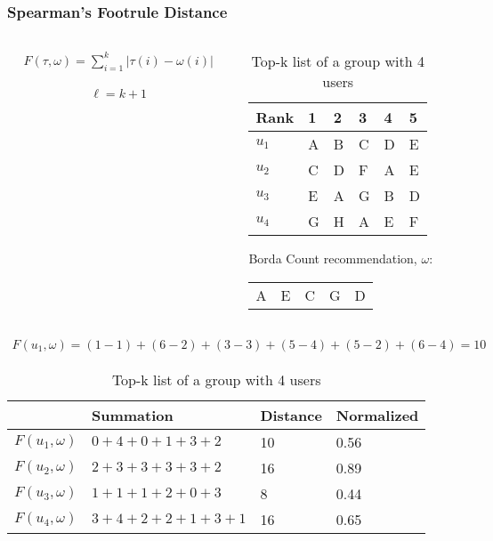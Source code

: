 \begin{frame}[t]
\frametitle{Spearman's Footrule Distance}
\begin{columns}
\begin{column}{0.45\textwidth}
\begin{align*}
F(\tau, \omega) = \sum_{i=1}^{k} | \tau (i) - \omega (i) |
\end{align*}

\begin{align*}
\ell = k + 1
\end{align*}

\end{column}
\begin{column}{0.55\textwidth}
\small
\vspace{-0.5cm}
\begin{table}
\captionsetup{font=footnotesize}
\begin{tabular}{|l|lllll|} \hline
Rank  & 1 & 2 & 3 & 4 & 5 \\\hline
$u_1$ & A & B & C & D & E \\
$u_2$ & C & D & F & A & E \\
$u_3$ & E & A & G & B & D \\
$u_4$ & G & H & A & E & F\\\hline
\end{tabular}
\caption{Top-k list of a group with 4 users}
\end{table}
\normalsize
Borda Count recommendation, $\omega$: \\
\begin{table}
\centering
\begin{tabular}{lllll}
 A & E & C & G & D
\end{tabular}
\end{table}
\end{column}
\end{columns}
\small
\begin{align*}
F(u_1, \omega) = (1-1) + (6-2) + (3-3) + (5-4) + (5-2) + (6-4) = 10
\end{align*}
\normalsize

\begin{table}
\captionsetup{font=footnotesize}
\begin{tabular}{|l|l|l|l|} \hline
				 & Summation 			  & Distance & Normalized \\\hline
$F(u_1, \omega)$ & $0 + 4 + 0 + 1 + 3 + 2$ & 10		 & 0.56 \\
$F(u_2, \omega)$ & $2 + 3 + 3 + 3 + 3 + 2$ & 16		 & 0.89 \\
$F(u_3, \omega)$ & $1 + 1 + 1 + 2 + 0 + 3$ & 8  	 & 0.44 \\
$F(u_4, \omega)$ & $3 + 4 + 2 + 2 + 1 + 3 + 1$ & 16 	 & 0.65 \\\hline
\end{tabular}
\caption{Top-k list of a group with 4 users}
\end{table}
\end{frame}

%
%
%
